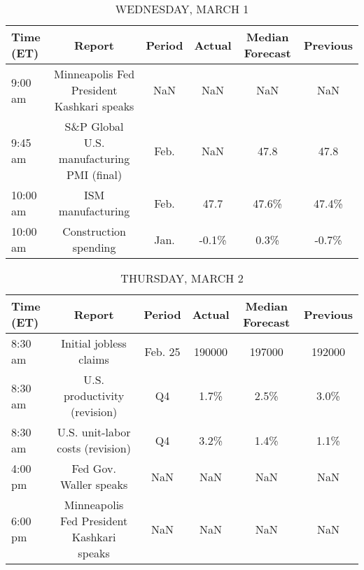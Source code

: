 \documentclass{article}%
\begin{document}
%


\begin{table}[htbp]%
\caption{WEDNESDAY, MARCH 1}%
\centering%
\begin{adjustbox}{width=1\textwidth}%
\begin{tabular}{lccccc}
\toprule
Time (ET) &                                    Report & Period & Actual & Median Forecast & Previous \\
\midrule
  9:00 am & Minneapolis Fed President Kashkari speaks &    NaN &    NaN &             NaN &      NaN \\
  9:45 am & S\&P Global U.S. manufacturing PMI (final) &   Feb. &    NaN &            47.8 &     47.8 \\
 10:00 am &                         ISM manufacturing &   Feb. &   47.7 &           47.6\% &    47.4\% \\
 10:00 am &                     Construction spending &   Jan. &  -0.1\% &            0.3\% &    -0.7\% \\
\bottomrule
\end{tabular}
%
\end{adjustbox}%
\end{table}

%


\begin{table}[htbp]%
\caption{THURSDAY, MARCH 2}%
\centering%
\begin{adjustbox}{width=1\textwidth}%
\begin{tabular}{lccccc}
\toprule
Time (ET) &                                    Report &  Period & Actual & Median Forecast & Previous \\
\midrule
  8:30 am &                    Initial jobless claims & Feb. 25 & 190000 &          197000 &   192000 \\
  8:30 am &              U.S. productivity (revision) &      Q4 &   1.7\% &            2.5\% &     3.0\% \\
  8:30 am &          U.S. unit-labor costs (revision) &      Q4 &   3.2\% &            1.4\% &     1.1\% \\
  4:00 pm &                    Fed Gov. Waller speaks &     NaN &    NaN &             NaN &      NaN \\
  6:00 pm & Minneapolis Fed President Kashkari speaks &     NaN &    NaN &             NaN &      NaN \\
\bottomrule
\end{tabular}
%
\end{adjustbox}%
\end{table}
\end{document}
